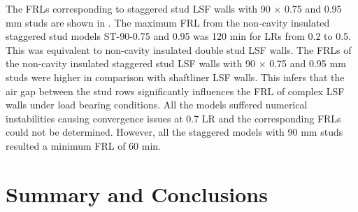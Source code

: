 The FRLs corresponding to staggered stud LSF walls with 90 $\times$ 0.75 and 0.95 mm studs are shown in . The maximum FRL from the non-cavity insulated staggered stud models ST-90-0.75 and 0.95 was 120 min for LRs from 0.2 to 0.5. This was equivalent to non-cavity insulated double stud LSF walls. The FRLs of the non-cavity insulated staggered stud LSF walls with 90 $\times$ 0.75 and 0.95 mm studs were higher in comparison with shaftliner LSF walls. This infers that the air gap between the stud rows significantly influences the FRL of complex LSF walls under load bearing conditions. All the models suffered numerical instabilities causing convergence issues at 0.7 LR and the corresponding FRLs could not be determined. However, all the staggered models with 90 mm studs resulted a minimum FRL of 60 min.

\section{Summary and Conclusions}

